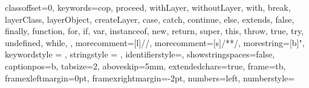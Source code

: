 \usepackage[formats]{listings}
\usepackage[T1]{fontenc}


\usepackage{soul}
\usepackage[scaled=.84]{DejaVuSansMono}


\newcommand{\code}[1]{\mbox{\texttt{#1}}} %
\newcommand{\scode}[1]{\texttt{\small{#1}}} %
\newcommand{\biglistingsfont}{ \ttfamily \normalsize \selectfont }
\newcommand{\listingsfont}{ \ttfamily \scriptsize \selectfont }
\newcommand{\tinylistingsfont}{\rmfamily \fontsize{6.5}{6.5} \selectfont}





\newcommand{\layerclass}{\code{jcop.lang.Layer}\xspace}
\newcommand{\with}{\code{with}\xspace}
\newcommand{\without}{\code{without}\xspace}
\newcommand{\withoutall}{\code{withoutall}\xspace}
\newcommand{\layer}{\code{layer}\xspace}
\newcommand{\before}{\code{before}\xspace}
\newcommand{\after}{\code{after}\xspace}
\newcommand{\finalmod}{\code{final}\xspace}
\newcommand{\abstractmod}{\code{abstract}\xspace}
\newcommand{\proceed}{\code{proceed}\xspace} 
\newcommand{\ind}{\hspace*{1.5em}}



 {
      classoffset=0,
      keywords={cop, proceed, withLayer, withoutLayer, with, break,%
                layerClass, layerObject, createLayer, %
        case, catch, continue, else, extends,%
                false, finally, function, for, if, var, instanceof,%
                new, %
                return, super, this, throw,%
                true, try, undefined, while, },
      morecomment=[l]//,%
      morecomment=[s]{/*}{*/},%
      morestring=[b]",%
      keywordstyle = \color[rgb]{0.54,0.27,0.00},
      stringstyle = \color[rgb]{0.0,0.533,0.8},
      identifierstyle=,
      showstringspaces=false,
      captionpos=b,
      tabsize=2,
      aboveskip=5mm,
      extendedchars=true,
      frame=tb,
      framexleftmargin=0pt,
      framexrightmargin=-2pt,
      numbers=left,
      numberstyle=\tiny    
}


